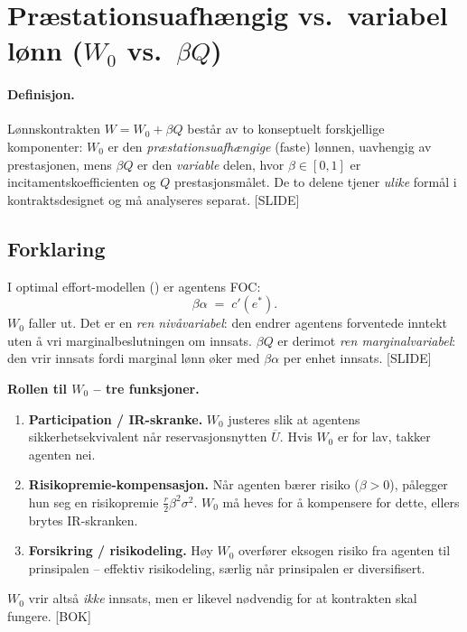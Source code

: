 \section{Præstationsuafhængig vs.\ variabel lønn ($W_0$ vs.\ $\beta Q$)}\label{thr:fixed-vs-variable-pay}

\paragraph{Definisjon.} Lønnskontrakten $W=W_0+\beta Q$ består av to konseptuelt forskjellige komponenter: $W_0$ er den \emph{præstationsuafhængige} (faste) lønnen, uavhengig av prestasjonen, mens $\beta Q$ er den \emph{variable} delen, hvor $\beta\in[0,1]$ er incitamentskoefficienten og $Q$ prestasjonsmålet. De to delene tjener \emph{ulike} formål i kontraktsdesignet og må analyseres separat. [SLIDE]

\subsection*{Forklaring}

I optimal effort-modellen () er agentens FOC:
\[
\beta\alpha\;=\;c'(e^{*}).
\]
$W_0$ faller ut. Det er en \emph{ren nivåvariabel}: den endrer agentens forventede inntekt uten å vri marginalbeslutningen om innsats. $\beta Q$ er derimot \emph{ren marginalvariabel}: den vrir innsats fordi marginal lønn øker med $\beta\alpha$ per enhet innsats. [SLIDE]

\textbf{Rollen til $W_0$ -- tre funksjoner.}
\begin{enumerate}\setlength{\itemsep}{1pt}
\item \textbf{Participation / IR-skranke.} $W_0$ justeres slik at agentens sikkerhetsekvivalent når reservasjonsnytten $\overline{U}$. Hvis $W_0$ er for lav, takker agenten nei.
\item \textbf{Risikopremie-kompensasjon.} Når agenten bærer risiko ($\beta>0$), pålegger hun seg en risikopremie $\tfrac{r}{2}\beta^{2}\sigma^{2}$. $W_0$ må heves for å kompensere for dette, ellers brytes IR-skranken.
\item \textbf{Forsikring / risikodeling.} Høy $W_0$ overfører eksogen risiko fra agenten til prinsipalen -- effektiv risikodeling, særlig når prinsipalen er diversifisert.
\end{enumerate}
$W_0$ vrir altså \emph{ikke} innsats, men er likevel nødvendig for at kontrakten skal fungere. [BOK]


